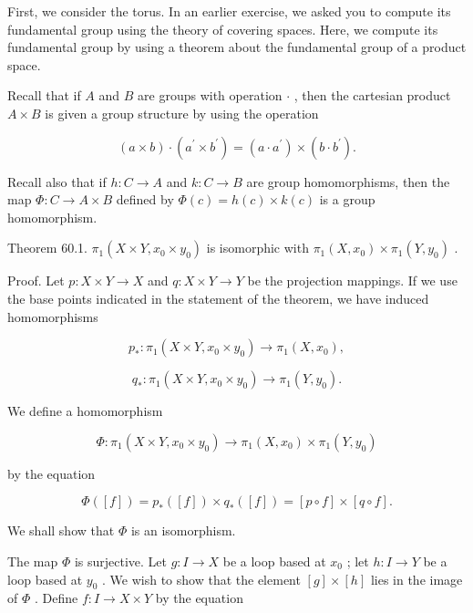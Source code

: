 \documentclass[10pt]{article}
\begin{document}
First, we consider the torus. In an earlier exercise, we asked you to compute its fundamental group using the theory of covering spaces. Here, we compute its fundamental group by using a theorem about the fundamental group of a product space.

Recall that if \(A\) and \(B\) are groups with operation \(\cdot\) , then the cartesian product \(A \times  B\) is given a group structure by using the operation

\[
\left( {a \times  b}\right)  \cdot  \left( {{a}^{\prime } \times  {b}^{\prime }}\right)  = \left( {a \cdot  {a}^{\prime }}\right)  \times  \left( {b \cdot  {b}^{\prime }}\right) .
\]

Recall also that if \(h : C \rightarrow  A\) and \(k : C \rightarrow  B\) are group homomorphisms, then the map \(\Phi  : C \rightarrow  A \times  B\) defined by \(\Phi \left( c\right)  = h\left( c\right)  \times  k\left( c\right)\) is a group homomorphism.

Theorem 60.1. \({\pi }_{1}\left( {X \times  Y,{x}_{0} \times  {y}_{0}}\right)\) is isomorphic with \({\pi }_{1}\left( {X,{x}_{0}}\right)  \times  {\pi }_{1}\left( {Y,{y}_{0}}\right)\) .

Proof. Let \(p : X \times  Y \rightarrow  X\) and \(q : X \times  Y \rightarrow  Y\) be the projection mappings. If we use the base points indicated in the statement of the theorem, we have induced homomorphisms

\[
{p}_{ * } : {\pi }_{1}\left( {X \times  Y,{x}_{0} \times  {y}_{0}}\right)  \rightarrow  {\pi }_{1}\left( {X,{x}_{0}}\right) ,
\]

\[
{q}_{ * } : {\pi }_{1}\left( {X \times  Y,{x}_{0} \times  {y}_{0}}\right)  \rightarrow  {\pi }_{1}\left( {Y,{y}_{0}}\right) .
\]

We define a homomorphism

\[
\Phi  : {\pi }_{1}\left( {X \times  Y,{x}_{0} \times  {y}_{0}}\right)  \rightarrow  {\pi }_{1}\left( {X,{x}_{0}}\right)  \times  {\pi }_{1}\left( {Y,{y}_{0}}\right)
\]

by the equation

\[
\Phi \left( \left\lbrack  f\right\rbrack  \right)  = {p}_{ * }\left( \left\lbrack  f\right\rbrack  \right)  \times  {q}_{ * }\left( \left\lbrack  f\right\rbrack  \right)  = \left\lbrack  {p \circ  f}\right\rbrack   \times  \left\lbrack  {q \circ  f}\right\rbrack  .
\]

We shall show that \(\Phi\) is an isomorphism.

The map \(\Phi\) is surjective. Let \(g : I \rightarrow  X\) be a loop based at \({x}_{0}\) ; let \(h : I \rightarrow  Y\) be a loop based at \({y}_{0}\) . We wish to show that the element \(\left\lbrack  g\right\rbrack   \times  \left\lbrack  h\right\rbrack\) lies in the image of \(\Phi\) . Define \(f : I \rightarrow  X \times  Y\) by the equation
\end{document}
